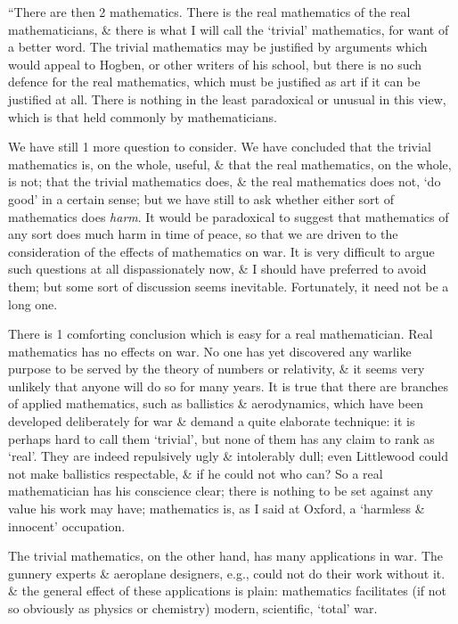 \documentclass{article}
\numberwithin{equation}{section}
\begin{document}
 ``There are then 2 mathematics. There is the real mathematics of the real mathematicians, \& there is what I will call the `trivial' mathematics, for want of a better word. The trivial mathematics may be justified by arguments which would appeal to Hogben, or other writers of his school, but there is no such defence for the real mathematics, which must be justified as art if it can be justified at all. There is nothing in the least paradoxical or unusual in this view, which is that held commonly by mathematicians.

We have still 1 more question to consider. We have concluded that the trivial mathematics is, on the whole, useful, \& that the real mathematics, on the whole, is not; that the trivial mathematics does, \& the real mathematics does not, `do good' in a certain sense; but we have still to ask whether either sort of mathematics does \textit{harm}. It would be paradoxical to suggest that mathematics of any sort does much harm in time of peace, so that we are driven to the consideration of the effects of mathematics on war. It is very difficult to argue such questions at all dispassionately now, \& I should have preferred to avoid them; but some sort of discussion seems inevitable. Fortunately, it need not be a long one.

There is 1 comforting conclusion which is easy for a real mathematician. Real mathematics has no effects on war. No one has yet discovered any warlike purpose to be served by the theory of numbers or relativity, \& it seems very unlikely that anyone will do so for many years. It is true that there are branches of applied mathematics, such as ballistics \& aerodynamics, which have been developed deliberately for war \& demand a quite elaborate technique: it is perhaps hard to call them `trivial', but none of them has any claim to rank as `real'. They are indeed repulsively ugly \& intolerably dull; even Littlewood could not make ballistics respectable, \& if he could not who can? So a real mathematician has his conscience clear; there is nothing to be set against any value his work may have; mathematics is, as I said at Oxford, a `harmless \& innocent' occupation.

The trivial mathematics, on the other hand, has many applications in war. The gunnery experts \& aeroplane designers, e.g., could not do their work without it. \& the general effect of these applications is plain: mathematics facilitates (if not so obviously as physics or chemistry) modern, scientific, `total' war.
\end{document}
